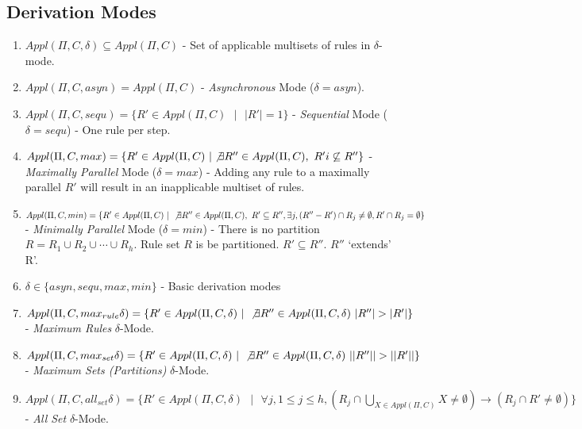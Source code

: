 \documentclass{article}
\newcommand{\s}{\text{ }}
\begin{document}
\subsection{Derivation Modes}

\begin{enumerate}
   \item $Appl(\Pi, C, \delta) \subseteq Appl(\Pi, C)$ - Set of applicable multisets of rules in 
         $\delta$-mode. 
   \item $Appl(\Pi, C, asyn) = Appl(\Pi, C)$ - \textit{Asynchronous} Mode ($\delta = asyn$).
   \item $Appl(\Pi, C, sequ) = \{R' \in Appl(\Pi, C) \s | \s |R'|=1\}$ - \textit{Sequential} Mode 
         ($\delta = sequ$) - One rule per step.
   \item $Appl(\Pi, C, max) = \{R' \in Appl(\Pi, C) \s | \not\exists R'' \in Appl(\Pi, C), \s R' i
         \not\subseteq R'' \}$ - \textit{Maximally Parallel} Mode ($\delta = max$) - Adding any rule
         to a maximally parallel $R'$ will result in an inapplicable multiset of rules.
   \item $Appl(\Pi, C, min) = \{R' \in Appl(\Pi, C) \s | \s \not\exists R'' \in Appl(\Pi,C), \s R' 
         \subseteq R'', \exists j, (R''-R') \cap R_j \neq \emptyset, R' \cap R_j = \emptyset\}$
         - \textit{Minimally Parallel} Mode ($\delta = min$) - There is no partition   
          $R = R_1 \cup R_2 \cup \cdots \cup R_h$. Rule set $R$ is be partitioned.
          $R' \subseteq R''$. $R''$ `extends' R'.
   \item $\delta \in \{asyn, sequ, max, min\}$ - Basic derivation modes
   \item $Appl(\Pi, C, max_{rule}\delta) = \{R' \in Appl(\Pi, C, \delta) \s | \s \not\exists R'' 
         \in Appl(\Pi,C, \delta) \s |R''| > |R'|\}$\\ - \textit{Maximum Rules} $\delta$-Mode.
   \item $Appl(\Pi, C, max_{set}\delta) = \{R' \in Appl(\Pi, C, \delta) \s | \s \not\exists R'' \in 
         Appl(\Pi,C, \delta) \s ||R''|| > ||R'||\}$\\ - \textit{Maximum Sets (Partitions)} $
         \delta$-Mode.
   \item $Appl(\Pi, C, all_{set}\delta) = \{R' \in Appl(\Pi, C, \delta) \s | \s \forall j, 1 \leq j 
         \leq h, (R_j \cap \bigcup_{X \in Appl(\Pi,C)} X \neq \emptyset) \rightarrow (R_j \cap R' 
         \neq \emptyset)\}$ - \textit{All Set} $\delta$-Mode.
\end{enumerate}
\end{document}
